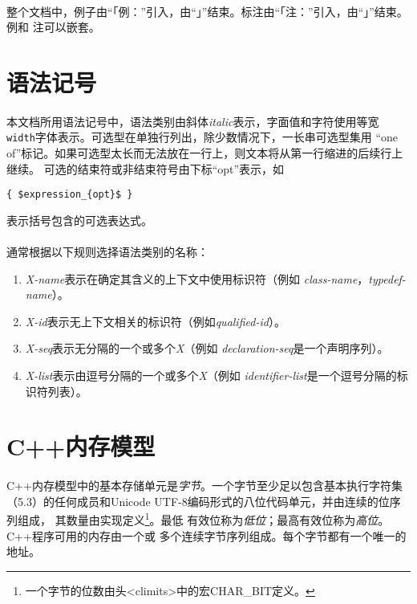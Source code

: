 \paragraph{}
整个文档中，例子由“「例：”引入，由“」”结束。标注由“「注：”引入，由“」”结束。例和
注可以嵌套。

\section{语法记号}
\paragraph{}
本文档所用语法记号中，语法类别由斜体\textit{italic}表示，字面值和字符使用等宽
\texttt{width}字体表示。可选型在单独行列出，除少数情况下，一长串可选型集用
“one of”标记。如果可选型太长而无法放在一行上，则文本将从第一行缩进的后续行上继续。
可选的结束符或非结束符号由下标“opt”表示，如
\begin{lstlisting}[mathescape]
  { $expression_{opt}$ }
\end{lstlisting}
表示括号包含的可选表达式。

\paragraph{}
通常根据以下规则选择语法类别的名称：
\begin{enumerate}
  \item \textit{X-name}表示在确定其含义的上下文中使用标识符（例如
    \textit{class-name}，\textit{typedef-name}）。
  \item \textit{X-id}表示无上下文相关的标识符（例如\textit{qualified-id}）。
  \item \textit{X-seq}表示无分隔的一个或多个\textit{X}（例如
    \textit{declaration-seq}是一个声明序列）。
  \item \textit{X-list}表示由逗号分隔的一个或多个\textit{X}（例如
    \textit{identifier-list}是一个逗号分隔的标识符列表）。
\end{enumerate}

\section{C++内存模型}
\paragraph{}
C++内存模型中的基本存储单元是\textit{字节}。一个字节至少足以包含基本执行字符集
（5.3）的任何成员和Unicode UTF-8编码形式的八位代码单元，并由连续的位序列组成，
其数量由实现定义\footnote{一个字节的位数由头<climits>中的宏CHAR\_BIT定义。}。最低
有效位称为\textit{低位}；最高有效位称为\textit{高位}。C++程序可用的内存由一个或
多个连续字节序列组成。每个字节都有一个唯一的地址。

